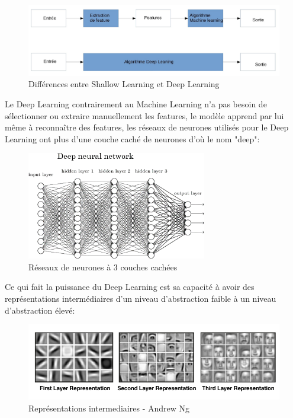             \begin{figure}[H]
                \centering
                \includegraphics[width=1\textwidth]{Images/MLvsDL}
                \caption{Différences entre Shallow Learning et Deep Learning}
                \label{fig:DiffMLDL}
            \end{figure}

            Le Deep Learning contrairement au Machine Learning n'a pas besoin de sélectionner
            ou extraire manuellement les features, le modèle apprend par lui même à reconnaître
            des features, les réseaux de neurones utilisés pour le Deep Learning
            ont plus d'une couche caché de neurones d'où le nom "deep": \newline

            \begin{figure}[H]
                \centering
                \includegraphics[width=0.7\textwidth]{Images/deepnn}
                \caption{Réseaux de neurones à 3 couches cachées}
                \label{fig:deepneuralnetwork}
            \end{figure}

            Ce qui fait la puissance du Deep Learning est sa capacité à avoir des représentations
            intermédiaires d'un niveau d'abstraction faible à un niveau d'abstraction élevé:

            \begin{figure}[H]
                \centering
                \includegraphics[width=1\textwidth]{Images/layeredrepresentation}
                \caption{Représentations intermediaires - Andrew Ng}
                \label{fig:deepnnrepresentation}
            \end{figure}


